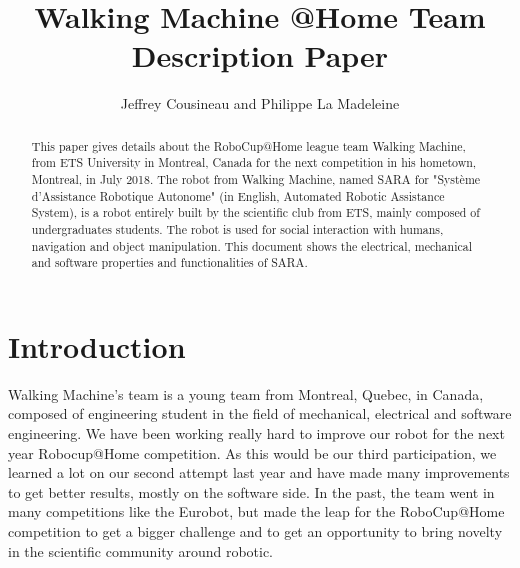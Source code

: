 \documentclass[runningheads,a4paper]{llncs}
\begin{document}
\newif\ifdraft
\draftfalse


\ifdraft
\setlength{\belowcaptionskip}{-5pt}
\fi

\title{Walking Machine @Home \newline {} Team Description Paper}

\author{Jeffrey Cousineau and Philippe La Madeleine}
\maketitle



\begin{abstract}

This paper gives details about the RoboCup@Home league team Walking Machine, from ETS University in Montreal, Canada for the next competition in his hometown, Montreal, in July 2018. The robot from Walking Machine, named SARA for "Système d’Assistance Robotique Autonome" (in English, Automated Robotic Assistance System), is a robot entirely built by the scientific club from ETS, mainly composed of undergraduates students. The robot is used for social interaction with humans, navigation and object manipulation. This document shows the electrical, mechanical and software properties and functionalities of SARA.
\end{abstract}


\section{Introduction}
\tab Walking Machine’s team is a young team from Montreal, Quebec, in Canada, composed of engineering student in the field of mechanical, electrical and software engineering. We have been working really hard to improve our robot for the next year Robocup@Home competition. As this would be our third participation, we learned a lot on our second attempt last year and have made many improvements to get better results, mostly on the software side. In the past, the team went in many competitions like the Eurobot, but made the leap for the RoboCup@Home competition to get a bigger challenge and to get an opportunity to bring novelty in the scientific community around robotic. \\
\end{document}

